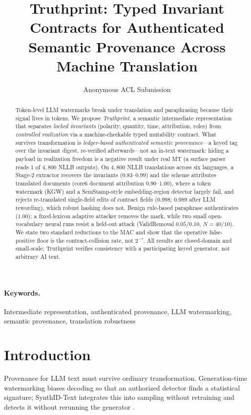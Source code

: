 \documentclass[11pt]{article}
\title{Truthprint: Typed Invariant Contracts for Authenticated Semantic Provenance Across Machine Translation}
\author{Anonymous ACL Submission}
\begin{document}
\maketitle

\begin{abstract}
Token-level LLM watermarks break under translation and paraphrasing because their signal lives in tokens. We propose \emph{Truthprint}, a semantic intermediate representation that separates \emph{locked invariants} (polarity, quantity, time, attribution, roles) from \emph{controlled realization} via a machine-checkable typed mutability contract. What survives transformation is \emph{ledger-based authenticated semantic provenance}---a keyed tag over the invariant digest, re-verified afterwards---not an in-text watermark: hiding a payload in realization freedom is a negative result under real MT (a surface parser reads $1$ of $4{,}800$ NLLB outputs). On $4{,}800$ NLLB translations across six languages, a Stage-2 extractor recovers the invariants ($0.83$--$0.99$) and the scheme attributes translated documents (core6 document attribution $0.90$--$1.00$), where a token watermark (KGW) and a SemStamp-style embedding-region detector largely fail, and rejects re-translated single-field edits of contract fields ($0.998$; $0.989$ after LLM rewording), which robust hashing does not. Benign rule-based paraphrase authenticates ($1.00$); a fixed-lexicon adaptive attacker removes the mark, while two small open-vocabulary neural runs resist a held-out attack (ValidRemoval $0.05$/$0.10$, $N{=}40$/$10$). We state two standard reductions to the MAC and show that the operative false-positive floor is the contract-collision rate, not $2^{-\tau}$. All results are closed-domain and small-scale; Truthprint verifies consistency with a participating keyed generator, not arbitrary AI text.
\end{abstract}

\paragraph{Keywords.} Intermediate representation, authenticated provenance, LLM watermarking, semantic provenance, translation robustness

\section{Introduction}
Provenance for LLM text must survive ordinary transformation. Generation-time watermarking biases decoding so that an authorized detector finds a statistical signature; SynthID-Text integrates this into sampling without retraining and detects it without rerunning the generator \cite{dathathri2024synthid}.
\end{document}
